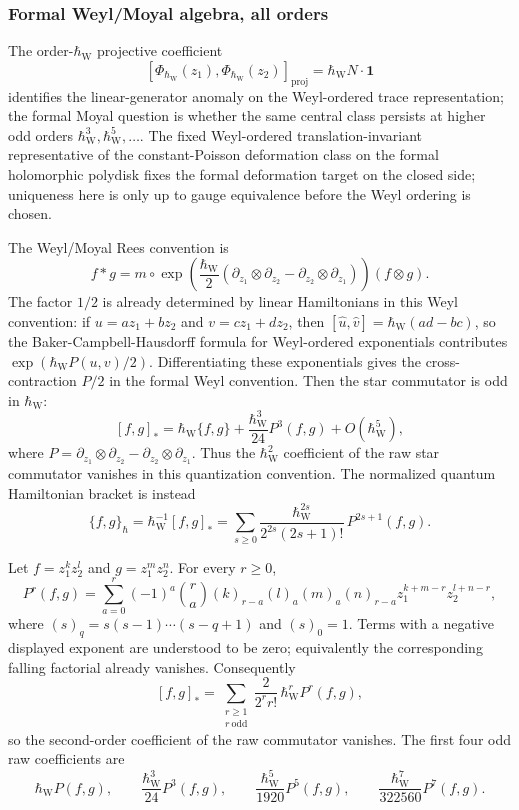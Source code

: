 \documentclass[11pt]{memoir}
\begin{document}
\subsubsection{Formal Weyl/Moyal algebra, all orders}
The order-\(\hbar_{\mathrm{W}}\) projective coefficient
\[
  [\Phi_{\hbar_{\mathrm{W}}}(z_1),
   \Phi_{\hbar_{\mathrm{W}}}(z_2)]_{\mathrm{proj}}
    =\hbar_{\mathrm{W}}N\cdot\mathbf 1
\]
identifies the linear-generator anomaly on the Weyl-ordered
trace representation; the formal Moyal question is whether the same
central class persists at higher odd orders
\(\hbar_{\mathrm{W}}^3,\hbar_{\mathrm{W}}^5,\dots\).
The fixed Weyl-ordered translation-invariant representative of the
constant-Poisson deformation class on the formal holomorphic polydisk
\cite{kontsevich-dq} fixes the formal deformation target on the closed side;
uniqueness here is only up to gauge equivalence before the Weyl ordering
is chosen.

The Weyl/Moyal Rees convention is
$$f*g=m\circ\exp\left(\frac{\hbar_{\mathrm{W}}}{2}
  (\partial_{z_1}\otimes\partial_{z_2}
   -\partial_{z_2}\otimes\partial_{z_1})\right)(f\otimes g).$$
The factor $1/2$ is already determined by linear Hamiltonians in this
Weyl convention: if
$u=az_1+bz_2$ and $v=cz_1+dz_2$, then
$[\widehat u,\widehat v]=\hbar_{\mathrm{W}}(ad-bc)$, so the Baker-Campbell-Hausdorff
formula for Weyl-ordered exponentials contributes
\(\exp(\hbar_{\mathrm{W}} P(u,v)/2)\). Differentiating these exponentials gives the
cross-contraction $P/2$ in the formal Weyl convention.
Then the star commutator is odd in \(\hbar_{\mathrm{W}}\):
$$[f,g]_*=\hbar_{\mathrm{W}}\{f,g\}+\frac{\hbar_{\mathrm{W}}^3}{24}P^3(f,g)+O(\hbar_{\mathrm{W}}^5),$$
where $P=\partial_{z_1}\otimes\partial_{z_2}
-\partial_{z_2}\otimes\partial_{z_1}$. Thus the \(\hbar_{\mathrm{W}}^2\) coefficient
of the raw star commutator vanishes in this quantization convention. The
normalized quantum Hamiltonian bracket is
instead
$$\{f,g\}_\hbar=\hbar_{\mathrm{W}}^{-1}[f,g]_*
  =\sum_{s\geq0}
    \frac{\hbar_{\mathrm{W}}^{2s}}{2^{2s}(2s+1)!}\,P^{2s+1}(f,g).$$

\begin{prop}\label{prop:moyal-monomial}
  Let $f=z_1^kz_2^l$ and $g=z_1^mz_2^n$. For every $r\geq0$,
  $$P^r(f,g)=
    \sum_{a=0}^r(-1)^a\binom{r}{a}
    (k)_{r-a}(l)_a(m)_a(n)_{r-a}
    z_1^{k+m-r}z_2^{l+n-r},$$
  where $(s)_q=s(s-1)\cdots(s-q+1)$ and $(s)_0=1$. Terms with a negative
  displayed exponent are understood to be zero; equivalently the corresponding
  falling factorial already vanishes. Consequently
  $$[f,g]_*=\sum_{\substack{r\geq1\\ r\ \mathrm{odd}}}
    \frac{2}{2^r r!}\,\hbar_{\mathrm{W}}^r P^r(f,g),$$
  so the second-order coefficient of the raw commutator vanishes. The first
  four odd raw coefficients are
  $$\hbar_{\mathrm{W}} P(f,g),\qquad
    \frac{\hbar_{\mathrm{W}}^3}{24}P^3(f,g),\qquad
    \frac{\hbar_{\mathrm{W}}^5}{1920}P^5(f,g),\qquad
    \frac{\hbar_{\mathrm{W}}^7}{322560}P^7(f,g).$$
\end{prop}
\end{document}
